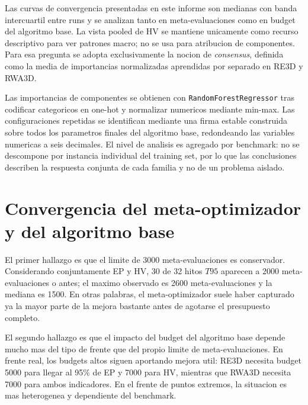 \documentclass[11pt,a4paper]{article}
\begin{document}
Las curvas de convergencia presentadas en este informe son medianas con banda intercuartil entre runs y se analizan tanto en meta-evaluaciones como en budget del algoritmo base. La vista pooled de HV se mantiene unicamente como recurso descriptivo para ver patrones macro; no se usa para atribucion de componentes. Para esa pregunta se adopta exclusivamente la nocion de \emph{consensus}, definida como la media de importancias normalizadas aprendidas por separado en RE3D y RWA3D.

Las importancias de componentes se obtienen con \texttt{RandomForestRegressor} tras codificar categoricos en one-hot y normalizar numericos mediante min-max. Las configuraciones repetidas se identifican mediante una firma estable construida sobre todos los parametros finales del algoritmo base, redondeando las variables numericas a seis decimales. El nivel de analisis es agregado por benchmark: no se descompone por instancia individual del training set, por lo que las conclusiones describen la respuesta conjunta de cada familia y no de un problema aislado.

\section{Convergencia del meta-optimizador y del algoritmo base}

El primer hallazgo es que el limite de 3000 meta-evaluaciones es conservador. Considerando conjuntamente EP y HV, 30 de 32 hitos \(T95\) aparecen a 2000 meta-evaluaciones o antes; el maximo observado es 2600 meta-evaluaciones y la mediana es 1500. En otras palabras, el meta-optimizador suele haber capturado ya la mayor parte de la mejora bastante antes de agotarse el presupuesto completo.

El segundo hallazgo es que el impacto del budget del algoritmo base depende mucho mas del tipo de frente que del propio limite de meta-evaluaciones. En frente real, los budgets altos siguen aportando mejora util: RE3D necesita budget 5000 para llegar al 95\% de EP y 7000 para HV, mientras que RWA3D necesita 7000 para ambos indicadores. En el frente de puntos extremos, la situacion es mas heterogenea y dependiente del benchmark.
\end{document}

